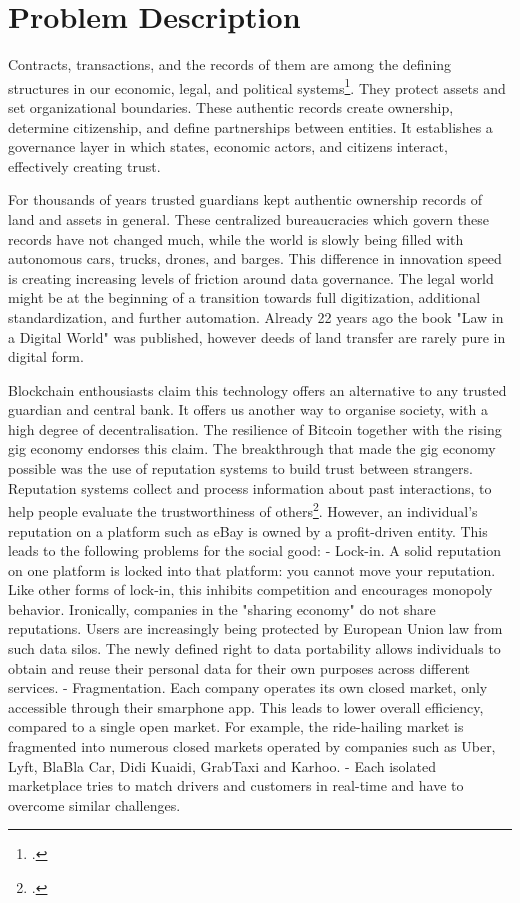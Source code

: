 \documentclass[USenglish]{article}
\begin{document}
\section{Problem Description}

Contracts, transactions, and the records of them are among the defining structures in our economic, legal, and political systems\footcite{harvardbusinessblockchain}.
They protect assets and set organizational boundaries.
These authentic records create ownership, determine citizenship, and define partnerships between entities.
It establishes a governance layer in which states, economic actors, and citizens interact, effectively creating trust.

For thousands of years trusted guardians kept authentic ownership records of land and assets in general.
These centralized bureaucracies which govern these records have not changed much, while the world is slowly being filled with autonomous cars, trucks, drones, and barges. 
This difference in innovation speed is creating increasing levels of friction around data governance. 
The legal world might be at the beginning of a transition towards full digitization, additional standardization, and further automation. 
Already 22 years ago the book "Law in a Digital World" was published, however deeds of land transfer are rarely pure in digital form.

Blockchain enthousiasts claim this technology offers an alternative to any trusted guardian and central bank.
It offers us another way to organise society, with a high degree of decentralisation.
The resilience of Bitcoin together with the rising gig economy endorses this claim.
The breakthrough that made the gig economy possible was the use of reputation systems to build trust between strangers.
Reputation systems collect and process information about past interactions, to help people evaluate the trustworthiness of others\footcite{resnick2002trust}.
However, an individual’s reputation on a platform such as eBay is owned by a profit-driven entity.
This leads to the following problems for the social good:
- Lock-in. A solid reputation on one platform is locked into that platform: you cannot move your reputation. Like other forms of lock-in, this inhibits competition and encourages monopoly behavior. Ironically, companies in the "sharing economy" do not share reputations. Users are increasingly being protected by European Union law from such data silos. The newly defined right to data portability allows individuals to obtain and reuse their personal data for their own purposes across different services. 
- Fragmentation. Each company operates its own closed market, only accessible through their smarphone app. This leads to lower overall efficiency, compared to a single open market. For example, the ride-hailing market is fragmented into numerous closed markets operated by companies such as Uber, Lyft, BlaBla Car, Didi Kuaidi, GrabTaxi and Karhoo.
- Each isolated marketplace tries to match drivers and customers in real-time and have to overcome similar challenges.
\end{document}
